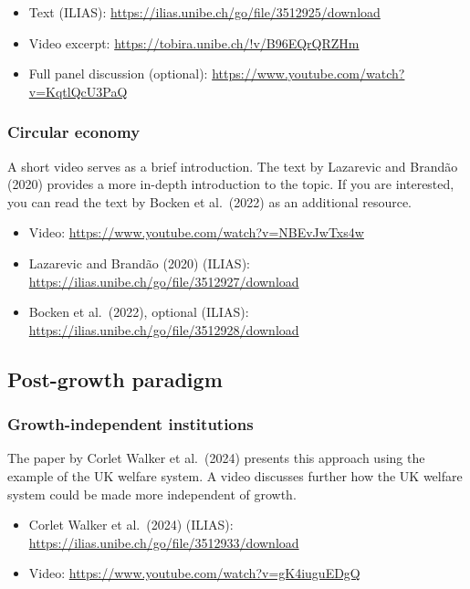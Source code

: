 \documentclass[
  british,
  a4paper,
  DIV=11,
  numbers=noendperiod,
  oneside,
  openany]{scrreprt}
\providecommand{\tightlist}{%
  \setlength{\itemsep}{0pt}\setlength{\parskip}{0pt}}
\begin{document}
\begin{itemize}
\tightlist
\item
  Text (ILIAS): \url{https://ilias.unibe.ch/go/file/3512925/download}
\item
  Video excerpt: \url{https://tobira.unibe.ch/!v/B96EQrQRZHm}
\item
  Full panel discussion (optional):
  \url{https://www.youtube.com/watch?v=KqtlQcU3PaQ}
\end{itemize}

\subsubsection{Circular economy}\label{circular-economy-1}

A short video serves as a brief introduction. The text by Lazarevic and
Brandão (2020) provides a more in-depth introduction to the topic. If
you are interested, you can read the text by Bocken et al.~(2022) as an
additional resource.

\begin{itemize}
\tightlist
\item
  Video: \url{https://www.youtube.com/watch?v=NBEvJwTxs4w}
\item
  Lazarevic and Brandão (2020) (ILIAS):
  \url{https://ilias.unibe.ch/go/file/3512927/download}
\item
  Bocken et al.~(2022), optional (ILIAS):
  \url{https://ilias.unibe.ch/go/file/3512928/download}
\end{itemize}

\subsection{Post-growth paradigm}\label{post-growth-paradigm-1}

\subsubsection{Growth-independent
institutions}\label{growth-independent-institutions-1}

The paper by Corlet Walker et al.~(2024) presents this approach using
the example of the UK welfare system. A video discusses further how the
UK welfare system could be made more independent of growth.

\begin{itemize}
\tightlist
\item
  Corlet Walker et al.~(2024) (ILIAS):
  \url{https://ilias.unibe.ch/go/file/3512933/download}
\item
  Video: \url{https://www.youtube.com/watch?v=gK4iuguEDgQ}
\end{itemize}
\end{document}
